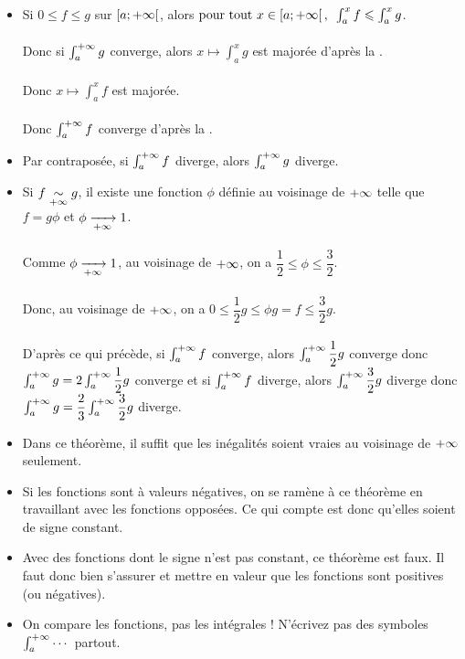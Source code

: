 \begin{dem}
\begin{itemize}
    \item Si \(0\leq f\leq g\) sur \(\left[a;+\infty\right[\), alors \(\quantifs{\tpt x\in\intervie{a}{\pinf}}\int_a^xf\leq\int_a^xg\). \\\\ Donc si \(\int_a^{+\infty}g\) converge, alors \(x\mapsto\int_a^xg\) est majorée d'après la . \\\\ Donc \(x\mapsto\int_a^xf\) est majorée. \\\\ Donc \(\int_a^{+\infty}f\) converge d'après la . \\
    \item Par contraposée, si \(\int_a^{+\infty}f\) diverge, alors \(\int_a^{+\infty}g\) diverge. \\
    \item Si \(f\underset{+\infty}{\sim}g\), il existe une fonction \(\phi\) définie au voisinage de \(+\infty\) telle que \(f=g\phi\) et \(\phi\xrightarrow[+\infty]{}1\). \\\\ Comme \(\phi\xrightarrow[+\infty]{}1\), au voisinage de \(+\infty\), on a \(\dfrac{1}{2}\leq\phi\leq\dfrac{3}{2}\). \\\\ Donc, au voisinage de \(+\infty\), on a \(0\leq\dfrac{1}{2}g\leq\phi g=f\leq\dfrac{3}{2}g\). \\\\ D'après ce qui précède, si \(\int_a^{+\infty}f\) converge, alors \(\int_a^{+\infty}\dfrac{1}{2}g\) converge donc \(\int_a^{+\infty}g=2\int_a^{+\infty}\dfrac{1}{2}g\) converge et si \(\int_a^{+\infty}f\) diverge, alors \(\int_a^{+\infty}\dfrac{3}{2}g\) diverge donc \(\int_a^{+\infty}g=\dfrac{2}{3}\int_a^{+\infty}\dfrac{3}{2}g\) diverge.
\end{itemize}
\end{dem}

\begin{rem}
\begin{itemize}
    \item Dans ce théorème, il suffit que les inégalités soient vraies au voisinage de \(+\infty\) seulement. \\
    \item Si les fonctions sont à valeurs négatives, on se ramène à ce théorème en travaillant avec les fonctions opposées. Ce qui compte est donc qu'elles soient de signe constant. \\
    \item Avec des fonctions dont le signe n'est pas constant, ce théorème est faux. Il faut donc bien s'assurer et mettre en valeur que les fonctions sont positives (ou négatives). \\
    \item On compare les fonctions, pas les intégrales ! N'écrivez pas des symboles \(\int_a^{+\infty}\cdots\) partout.
\end{itemize}
\end{rem}

